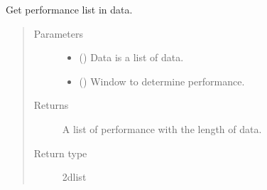 \documentclass[letterpaper,10pt,english]{sphinxmanual}
\begin{document}
\begin{fulllineitems}
\label{\detokenize{NoSeMazeController/Analysis:Analysis.Performance.get_performance}}
\pysigstartsignatures
{}
\pysigstopsignatures
\sphinxAtStartPar
Get performance list in data.
\begin{quote}\begin{description}
\item[{Parameters}] \leavevmode\begin{itemize}
\item {} 
\sphinxAtStartPar
{} () \textendash{} Data is a list of data.

\item {} 
\sphinxAtStartPar
{} () \textendash{} Window to determine performance.

\end{itemize}

\item[{Returns}] \leavevmode
\sphinxAtStartPar
{} \textendash{} A list of performance with the length of data.

\item[{Return type}] \leavevmode
\sphinxAtStartPar
2d\sphinxhyphen{}list

\end{description}\end{quote}

\end{fulllineitems}

\end{document}
